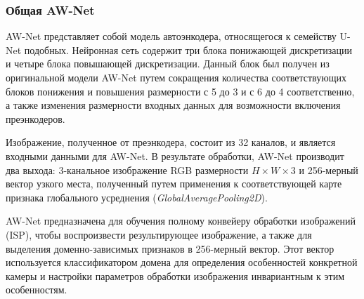 \subsubsection{Общая AW-Net}

AW-Net представляет собой модель автоэнкодера, относящегося к семейству U-Net подобных. Нейронная сеть содержит три блока понижающей дискретизации и четыре блока повышающей дискретизации. Данный блок был получен из оригинальной модели AW-Net путем сокращения количества соответствующих блоков понижения и повышения размерности с 5 до 3 и с 6 до 4 соответственно, а также изменения размерности входных данных для возможности включения преэнкодеров.

Изображение, полученное от преэнкодера, состоит из 32 каналов, и является входными данными для AW-Net. В результате обработки, AW-Net производит два выхода: 3-канальное изображение RGB размерности $H\times W\times 3$ и 256-мерный вектор узкого места, полученный путем применения к соответствующей карте признака глобального усреднения (\textit{GlobalAveragePooling2D}).

AW-Net предназначена для обучения полному конвейеру обработки изображений (ISP), чтобы воспроизвести результирующее изображение, а также для выделения доменно-зависимых признаков в 256-мерный вектор. Этот вектор используется классификатором домена для определения особенностей конкретной камеры и настройки параметров обработки изображения инвариантным к этим особенностям. 
